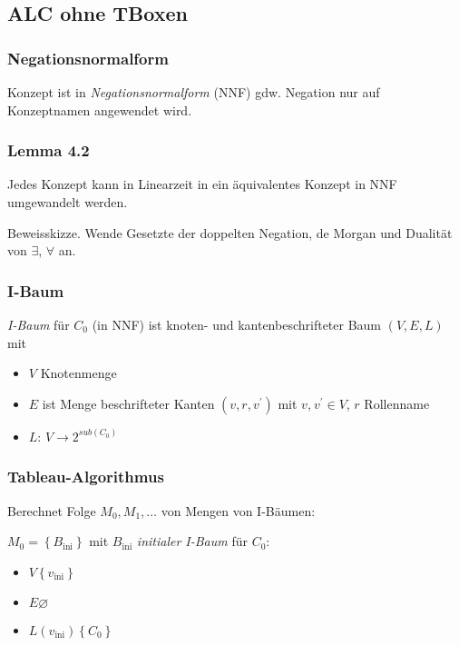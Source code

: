 \subsection{ALC ohne TBoxen}\label{alc-ohne-tboxen}

\subsubsection{Negationsnormalform}\label{negationsnormalform}

Konzept ist in \emph{Negationsnormalform} (NNF) gdw. Negation nur auf
Konzeptnamen angewendet wird.

\subsubsection{Lemma 4.2}\label{lemma-4.2}

Jedes Konzept kann in Linearzeit in ein äquivalentes Konzept in NNF
umgewandelt werden.

Beweisskizze. Wende Gesetzte der doppelten Negation, de Morgan und
Dualität von $\exists$, $\forall$ an.

\subsubsection{I-Baum}\label{i-baum}

\emph{I-Baum} für $C_{0}$ (in NNF) ist knoten- und kantenbeschrifteter
Baum $\left( V,E,L \right)$ mit

\begin{itemize}
\item
  $V$ Knotenmenge
\item
  $E$ ist Menge beschrifteter Kanten $\left( v,r,v^{'} \right)$ mit
  $v$,$\ v^{'} \in V$, $r$ Rollenname
\item
  $L$: $V \rightarrow 2^{sub(C_{0})}$
\end{itemize}

\subsubsection{Tableau-Algorithmus}\label{tableau-algorithmus}

Berechnet Folge $M_{0},M_{1},\ldots$ von Mengen von I-Bäumen:

$M_{0} = \left\{ B_{\text{ini}} \right\}$ mit $B_{\text{ini}}$
\emph{initialer I-Baum} für $C_{0}$:

\begin{itemize}
\item
  $V \left\{ v_{\text{ini}} \right\}$
\item
  $E \varnothing$
\item
  $L\left( v_{\text{ini}} \right) \left\{ C_{0} \right\}$
\end{itemize}


